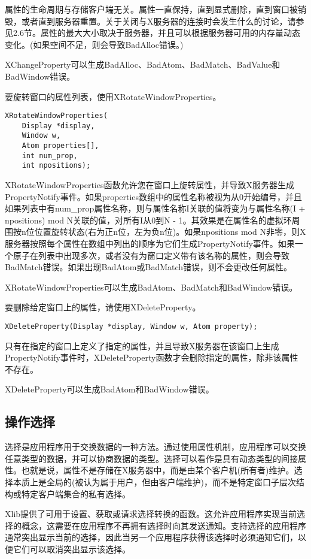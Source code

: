 属性的生命周期与存储客户端无关。属性一直保持，直到显式删除，直到窗口被销毁，或者直到服务器重置。关于关闭与X服务器的连接时会发生什么的讨论，请参见2.6节。属性的最大大小取决于服务器，并且可以根据服务器可用的内存量动态变化。(如果空间不足，则会导致BadAlloc错误。)

XChangeProperty可以生成BadAlloc、BadAtom、BadMatch、BadValue和BadWindow错误。

要旋转窗口的属性列表，使用XRotateWindowProperties。
\begin{lstlisting}
XRotateWindowProperties(
	Display *display,
	Window w,
	Atom properties[],
	int num_prop,
	int npositions);
\end{lstlisting}

XRotateWindowProperties函数允许您在窗口上旋转属性，并导致X服务器生成PropertyNotify事件。如果properties数组中的属性名称被视为从0开始编号，并且如果列表中有num\_prop属性名称，则与属性名称I关联的值将变为与属性名称(I + npositions) mod N关联的值，对所有I从0到N - 1。其效果是在属性名的虚拟环周围按n位位置旋转状态(右为正n位，左为负n位)。如果npositions mod N非零，则X服务器按照每个属性在数组中列出的顺序为它们生成PropertyNotify事件。如果一个原子在列表中出现多次，或者没有为窗口定义带有该名称的属性，则会导致BadMatch错误。如果出现BadAtom或BadMatch错误，则不会更改任何属性。

XRotateWindowProperties可以生成BadAtom、BadMatch和BadWindow错误。

要删除给定窗口上的属性，请使用XDeleteProperty。
\begin{lstlisting}
XDeleteProperty(Display *display, Window w, Atom property);
\end{lstlisting}

只有在指定的窗口上定义了指定的属性，并且导致X服务器在该窗口上生成PropertyNotify事件时，XDeleteProperty函数才会删除指定的属性，除非该属性不存在。

XDeleteProperty可以生成BadAtom和BadWindow错误。


\subsection{操作选择}

选择是应用程序用于交换数据的一种方法。通过使用属性机制，应用程序可以交换任意类型的数据，并可以协商数据的类型。选择可以看作是具有动态类型的间接属性。也就是说，属性不是存储在X服务器中，而是由某个客户机(所有者)维护。选择本质上是全局的(被认为属于用户，但由客户端维护)，而不是特定窗口子层次结构或特定客户端集合的私有选择。

Xlib提供了可用于设置、获取或请求选择转换的函数。这允许应用程序实现当前选择的概念，这需要在应用程序不再拥有选择时向其发送通知。支持选择的应用程序通常突出显示当前的选择，因此当另一个应用程序获得该选择时必须通知它们，以便它们可以取消突出显示该选择。

